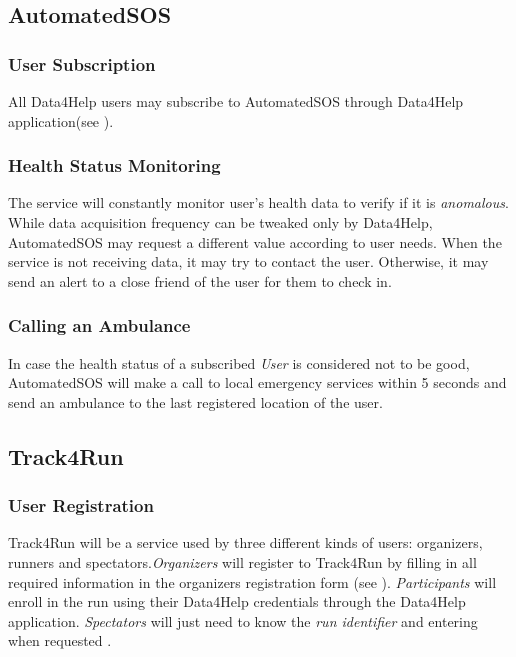 \documentclass[../../rasd.tex]{subfiles}
\begin{document}
			\subsection{AutomatedSOS}
				
				\subsubsection{User Subscription}
				All Data4Help users may subscribe to AutomatedSOS through Data4Help application(see ).
				
				\subsubsection{Health Status Monitoring}
				The service will constantly monitor user's health data to verify if it is \textit{anomalous}. While data acquisition frequency can be tweaked only by Data4Help, AutomatedSOS may request a different value according to user needs.  When the service is not receiving data, it may try to contact the user. Otherwise, it may send an alert to a close friend of the user for them to check in.
				
				\subsubsection{Calling an Ambulance} 
				In case the health status of a subscribed \textit{User} is considered not to be good, AutomatedSOS will make a call to local emergency services within 5 seconds and send an ambulance to the last registered location of the user.

			\subsection{Track4Run}
				
				\subsubsection{User Registration}
				Track4Run will be a service used by three different kinds of users: organizers, runners and spectators.\textit{Organizers} will register to Track4Run by filling in all required information in the organizers registration form (see ). \textit{Participants} will enroll in the run using their Data4Help credentials through the Data4Help application. \textit{Spectators} will just need to know the \textit{run identifier} and entering when requested .
				
\end{document}
